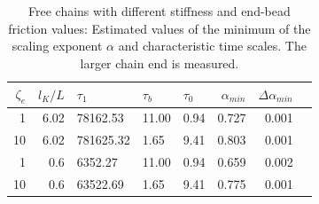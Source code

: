 \documentclass[
    paper=A4,pagesize=automedia,fontsize=12pt,
    BCOR=15mm,DIV=22,
    twoside,headinclude,footinclude=false,
    fleqn,             %
    bibliography=totocnumbered,          %
    listof=totoc,                %
    listof=flat,                 %
    cleardoublepage=empty      %
    numbers=endperiod
]{scrartcl}
\begin{document}
\begin{table}[p]
    \centering
    
    \begin{tabular}{rrlllrrr}
        \toprule
        $\zeta_e$ & $l_K/L$ & $\tau_1$ & $\tau_b$ & $\tau_0$ & $\alpha_{min}$ & $\Delta \alpha_{min}$ \\
        \midrule
        1 & 6.02 & 78162.53 & 11.00 & 0.94 & 0.727 & 0.001\\
        10 & 6.02 & 781625.32 & 1.65 & 9.41 & 0.803 & 0.001\\
        1 & 0.6 & 6352.27 & 11.00 & 0.94 & 0.659 & 0.002\\
        10 & 0.6 & 63522.69 & 1.65 & 9.41 & 0.775 & 0.001\\
        \bottomrule
        \end{tabular}
    \caption{
        Free chains with different stiffness and end-bead friction values: 
        Estimated values of the minimum of the scaling exponent $\alpha$ and
        characteristic time scales. The larger chain end is measured.
    }
    \label{table:free_chain_alpha_estimations}
\end{table}
\end{document}
